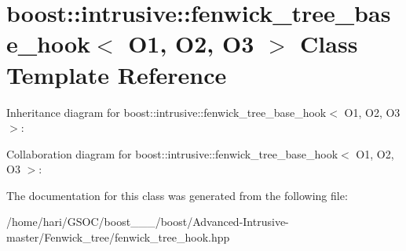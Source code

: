 \hypertarget{classboost_1_1intrusive_1_1fenwick__tree__base__hook}{}\section{boost\+:\+:intrusive\+:\+:fenwick\+\_\+tree\+\_\+base\+\_\+hook$<$ O1, O2, O3 $>$ Class Template Reference}
\label{classboost_1_1intrusive_1_1fenwick__tree__base__hook}


Inheritance diagram for boost\+:\+:intrusive\+:\+:fenwick\+\_\+tree\+\_\+base\+\_\+hook$<$ O1, O2, O3 $>$\+:


Collaboration diagram for boost\+:\+:intrusive\+:\+:fenwick\+\_\+tree\+\_\+base\+\_\+hook$<$ O1, O2, O3 $>$\+:


The documentation for this class was generated from the following file\+:\begin{DoxyCompactItemize}
\item 
/home/hari/\+G\+S\+O\+C/boost\+\_\+\_\+\_/boost/\+Advanced-\/\+Intrusive-\/master/\+Fenwick\+\_\+tree/fenwick\+\_\+tree\+\_\+hook.\+hpp\end{DoxyCompactItemize}
